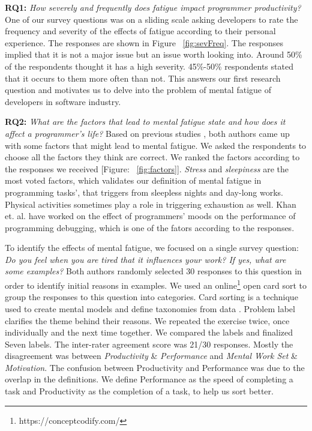 \documentclass{acm_proc_article-sp}
\begin{document}
\textbf{RQ1:} \textit{How severely and frequently does fatigue impact
programmer productivity?} One of our survey questions was on a sliding scale
asking developers to rate the frequency and severity of the effects of fatigue
according to their personal experience. The responses are shown in Figure
~\ref{fig:sevFreq}. The responses implied that it is not a major issue but an
issue worth looking into. Around 50\% of the respondents thought it has a high
severity. 45\%-50\% respondents stated that it occurs to them more often
than not. This answers our first research question and motivates us to delve
into the problem of mental fatigue of developers in software industry.

\textbf{RQ2:} \textit{What are the factors that lead to mental fatigue state and
how does it affect a programmer's life?} Based on previous studies
\cite{saito:industry}, both authors came up with some factors that might lead to
mental fatigue. We asked the respondents to choose all the factors they think
are correct. We ranked the factors according to the responses we received
[Figure: ~\ref{fig:factors}]. \textit{Stress} and \textit{sleepiness} are the
most voted factors, which validates our definition of mental fatigue in
programming tasks', that triggers from sleepless nights and day-long works.
Physical activities sometimes play a role in triggering exhaustion as well. Khan
et. al. \cite{khan:mood} have worked on the effect of programmers' moods on the
performance of programming debugging, which is one of the fators according to
the responses.

To identify the effects of mental fatigue, we focused on a single survey
question:
\textit{Do you feel when you are tired that it influences your work? If yes,
what are some examples?}
Both authors randomly selected 30 responses to this question in order to
identify initial reasons in examples. We used an
online\footnote{https://conceptcodify.com/} open card sort to group the
responses to this question into categories. Card sorting is a technique used to
create mental  models and define taxonomies from data \cite{begel:cards}.
Problem label clarifies the theme behind their reasons. We repeated the exercise
twice, once individually and the next time together. We compared the labels and
finalized Seven labels. The inter-rater agreement score was 21/30 responses.
Mostly the disagreement was between \textit{Productivity} \& \textit{Performance} and
\textit{Mental Work Set} \& \textit{Motivation}. The confusion between
Productivity and Performance was due to the overlap in the definitions. We
define Performance as the speed of completing a task and Productivity as the
completion of a task, to help us sort better.
\end{document}
